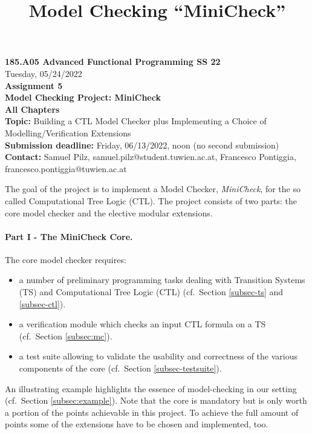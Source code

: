 \documentclass{article}
\title{Model Checking ``MiniCheck''}
\begin{document}
\large
\thispagestyle{empty}
\begin{center}
  {\Large \textbf{185.A05 Advanced Functional Programming SS 22}}  \\ [1ex] 
            Tuesday, 05/24/2022 \\
               {\Large \textbf{Assignment 5}} \\[.5ex]
              {\Large \textbf{Model Checking Project: MiniCheck}} \\[.5ex]
                 \textbf{All Chapters}  \\ [.75ex]
           \textbf{Topic:} Building a CTL Model Checker plus Implementing a Choice of Modelling/Verification Extensions  \\[1ex]
          \textbf{Submission deadline:} Friday, 06/13/2022, noon (no second submission)  \\ [0.5ex]
          \textbf{Contact:} Samuel Pilz, samuel.pilz@student.tuwien.ac.at, 
                            Francesco Pontiggia, francesco.pontiggia@tuwien.ac.at 
\end{center}

\vspace{1ex}
\noindent
\noindent

\newcommand{\code}[1]{\texttt{#1}}

\noindent
The goal of the project is to implement a  Model Checker, \textit{MiniCheck}, 
for the so called Computational Tree Logic (CTL). 
The project consists of two parts: the core model checker and 
the elective modular extensions. 

\paragraph{Part I - The MiniCheck Core.} The core model checker requires: 
\begin{itemize}
    \item a number of preliminary programming tasks dealing with Transition Systems (TS)
          and Computational Tree Logic (CTL) (cf.~Section \ref{subsec-ts} and \ref{subsec-ctl}).
    \item a verification module which checks an input CTL formula on a TS (cf.~Section \ref{subsec:mc}).
    \item a test suite allowing to validate the usability and correctness of the
          various components of the core (cf.~Section \ref{subsec-testsuite}).
\end{itemize}  
An illustrating example highlights the essence of model-checking in our setting (cf.~Section \ref{subsec:example}). Note that the core is mandatory but is only worth a portion of the points achievable in this project. To achieve the full amount of points some of the extensions have to be chosen and implemented, too.
\end{document}
